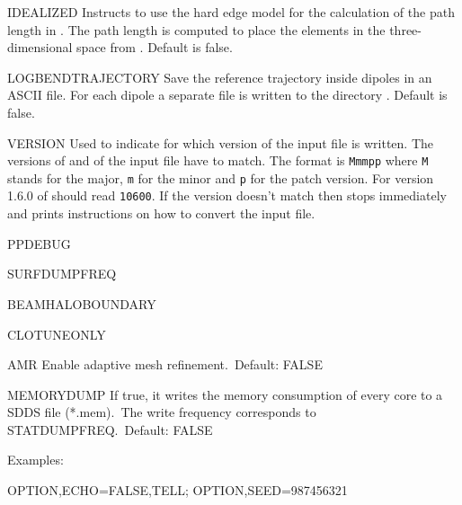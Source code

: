 \begin{kdescription}
  \item[IDEALIZED]
  Instructs to use the hard edge model for the calculation of the path length in \opalt. The path length is computed to place the elements in the three-dimensional space from . Default is false.

  \item[LOGBENDTRAJECTORY]
  Save the reference trajectory inside dipoles in an ASCII file. For each dipole a separate file is written to the directory . Default is false.

  \item[VERSION]
  Used to indicate for which version of \opal the input file is written. The versions of \opal and of the input file have to match. The format is \texttt{Mmmpp} where \texttt{M} stands for the major, \texttt{m} for the minor and \texttt{p} for the patch version. For version 1.6.0 of \opal {} should read \texttt{10600}. If the version doesn't match then \opal stops immediately and prints instructions on how to convert the input file.

  \item[PPDEBUG]

  \item[SURFDUMPFREQ]

  \item[BEAMHALOBOUNDARY]

  \item[CLOTUNEONLY]
  
  \item[AMR]
  Enable adaptive mesh refinement.\ Default: FALSE

  \item[MEMORYDUMP]
  If true, it writes the memory consumption of every core to a SDDS file (*.mem).\ The write frequency corresponds to
  STATDUMPFREQ.\ Default: FALSE
\end{kdescription}


\noindent Examples:
\begin{example}
OPTION,ECHO=FALSE,TELL;
OPTION,SEED=987456321
\end{example}

